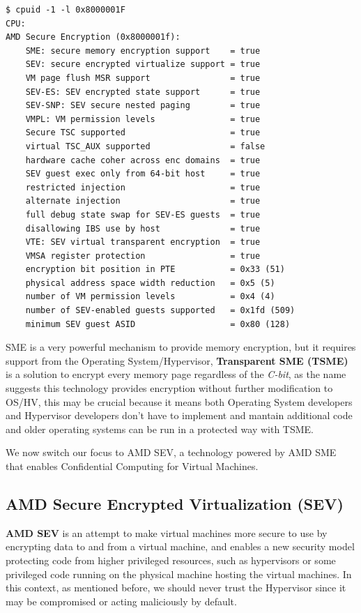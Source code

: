\documentclass[twocolumn]{article}
\begin{document}
\begin{verbatim}
$ cpuid -1 -l 0x8000001F
CPU:
AMD Secure Encryption (0x8000001f):
    SME: secure memory encryption support    = true
    SEV: secure encrypted virtualize support = true
    VM page flush MSR support                = true
    SEV-ES: SEV encrypted state support      = true
    SEV-SNP: SEV secure nested paging        = true
    VMPL: VM permission levels               = true
    Secure TSC supported                     = true
    virtual TSC_AUX supported                = false
    hardware cache coher across enc domains  = true
    SEV guest exec only from 64-bit host     = true
    restricted injection                     = true
    alternate injection                      = true
    full debug state swap for SEV-ES guests  = true
    disallowing IBS use by host              = true
    VTE: SEV virtual transparent encryption  = true
    VMSA register protection                 = true
    encryption bit position in PTE           = 0x33 (51)
    physical address space width reduction   = 0x5 (5)    
    number of VM permission levels           = 0x4 (4)
    number of SEV-enabled guests supported   = 0x1fd (509)
    minimum SEV guest ASID                   = 0x80 (128)
\end{verbatim}
    
SME is a very powerful mechanism to provide memory encryption, but it requires support from the Operating System/Hypervisor, \textbf{Transparent SME (TSME)} is a solution to encrypt every memory page regardless of the \textit{C-bit}, as the name suggests this technology provides encryption without further modification to OS/HV, this may be crucial because it means both Operating System developers and Hypervisor developers don't have to implement and mantain additional code and older operating systems can be run in a protected way with TSME.

We now switch our focus to AMD SEV, a technology powered by AMD SME that enables Confidential Computing for Virtual Machines.

\subsection{AMD Secure Encrypted Virtualization (SEV)}

\textbf{AMD SEV} is an attempt to make virtual machines more secure to use by encrypting data to and from a virtual machine, and enables a new security model protecting code from higher privileged resources, such as hypervisors or some privileged code running on the physical machine hosting the virtual machines. In this context, as mentioned before, we should never trust the Hypervisor since it may be compromised or acting maliciously by default.
\end{document}
